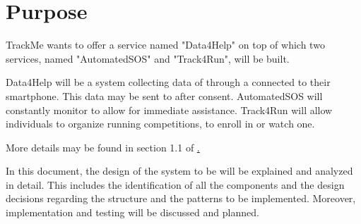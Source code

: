 \documentclass[../../DD.tex]{subfiles}
\begin{document}
\section{Purpose}
	TrackMe wants to offer a service named "Data4Help" on top of which two services, named "AutomatedSOS" and "Track4Run", will be built.

	Data4Help will be a system collecting data of  through a  connected to their smartphone. This data may be sent to  after  consent.
	AutomatedSOS will constantly monitor  to allow for immediate assistance.
	Track4Run will allow individuals to organize running competitions, to enroll in or watch one.

	More details may be found in section 1.1 of \hyperref[3].

	In this document, the design of the system to be will be explained and analyzed in detail. This includes the identification of all the components and the design decisions regarding the structure and the patterns to be implemented. Moreover, implementation and testing will be discussed and planned.
\end{document}
